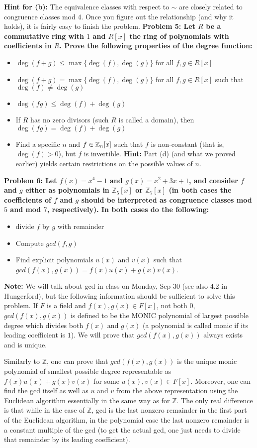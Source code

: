 \documentclass[11pt]{amsart}
\begin{document}
{\bf Hint for (b):} The equivalence classes with respect to $\sim$ are closely related to congruence classes mod $4$. Once you figure out the relationship (and why it holds), it is fairly easy to finish the problem.
\skv
\bf{Problem 5: }\rm Let $R$ be a commutative ring with $1$ and $R[x]$ the ring of polynomials with coefficients in $R$. Prove the following properties of the degree function:
\begin{itemize}
\item[(a)] $\deg(f+g)\leq \max\{\deg(f),\deg(g)\}$ for all $f,g\in R[x]$
\item[(b)] $\deg(f+g) = \max\{\deg(f),\deg(g)\}$ for all $f,g\in R[x]$ such that $\deg(f)\neq \deg(g)$
\item[(c)] $\deg(fg)\leq \deg(f)+\deg(g)$
\item[(d)] If $R$ has no zero divisors (such $R$ is called a domain), then $\deg(fg)=\deg(f)+\deg(g)$
\item[(e)] Find a specific $n$ and $f\in {\mathbb Z}_n[x]$ such that $f$ is non-constant (that is, $\deg(f)>0$), but $f$ is invertible.
{\bf Hint:} Part (d) (and what we proved earlier) yields certain restrictions on the possible values of $n$.
 \end{itemize}
\skv
\bf{Problem 6: }\rm Let $f(x)=x^4-1$ and $g(x)=x^2+3x+1$, and consider $f$ and $g$ either as polynomials in $\mathbb Z_5[x]$ or 
$\mathbb Z_7[x]$ (in both cases the coefficients of $f$ and $g$ should be interpreted as congruence classes mod $5$ and mod $7$,
respectively). In both cases do the following:
\begin{itemize}
\item[(a)] divide $f$ by $g$ with remainder
\item[(b)] Compute $gcd(f,g)$
\item[(c)] Find explicit polynomials $u(x)$ and $v(x)$ such that $gcd(f(x),g(x))=f(x)u(x)+g(x)v(x)$. 
 \end{itemize}
{\bf Note:} We will talk about gcd in class on Monday, Sep 30 (see also 4.2 in Hungerford), but the following information should be sufficient
to solve this problem. If $F$ is a field and $f(x),g(x)\in F[x]$, not both $0$, $gcd(f(x),g(x))$ is defined to be the MONIC polynomial
of largest possible degree which divides both $f(x)$ and $g(x)$ (a polynomial is called monic if its leading coefficient is $1$).
We will prove that $gcd(f(x),g(x))$ always exists and is unique.

Similarly to $\mathbb Z$, one can prove that $gcd(f(x),g(x))$ is the unique monic polynomial of smallest possible degree representable
as $f(x)u(x)+g(x)v(x)$ for some $u(x),v(x)\in F[x]$. Moreover, one can find the gcd itself as well as $u$ and $v$ from the above representation
using the Euclidean algorithm essentially in the same way as for $\mathbb Z$. The only real difference is that while in the case of $\mathbb Z$,
gcd is the last nonzero remainder in the first part of the Euclidean algorithm, in the polynomial case the last nonzero remainder is a constant multiple of the gcd (to get the actual gcd, one just needs to divide that remainder by its leading coefficient).
\end{document}
